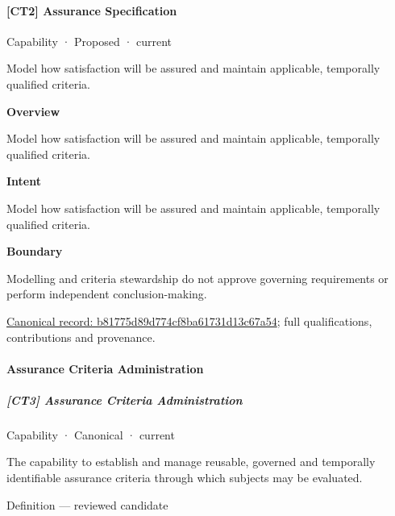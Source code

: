 \paragraph{[CT2] Assurance Specification}

\label{element:b81775d89d774cf8ba61731d13c67a54}
{\small Capability · Proposed · current}\par

Model how satisfaction will be assured and maintain applicable, temporally qualified criteria.



\textbf{Overview}



Model how satisfaction will be assured and maintain applicable, temporally qualified criteria.



\textbf{Intent}



Model how satisfaction will be assured and maintain applicable, temporally qualified criteria.



\textbf{Boundary}



Modelling and criteria stewardship do not approve governing requirements or perform independent conclusion-making.


{\footnotesize \href{../../../../continuum/strategy/capability/b81775d89d774cf8ba61731d13c67a54.md}{Canonical record: b81775d89d774cf8ba61731d13c67a54}; full qualifications, contributions and provenance.}\par
\paragraph{Assurance Criteria Administration}

\subparagraph{[CT3] Assurance Criteria Administration}

\label{element:1bfd71f24321428c8871b587d413f47e}
{\small Capability · Canonical · current}\par

The capability to establish and manage reusable, governed and temporally identifiable assurance criteria through which subjects may be evaluated.



Definition — reviewed candidate



